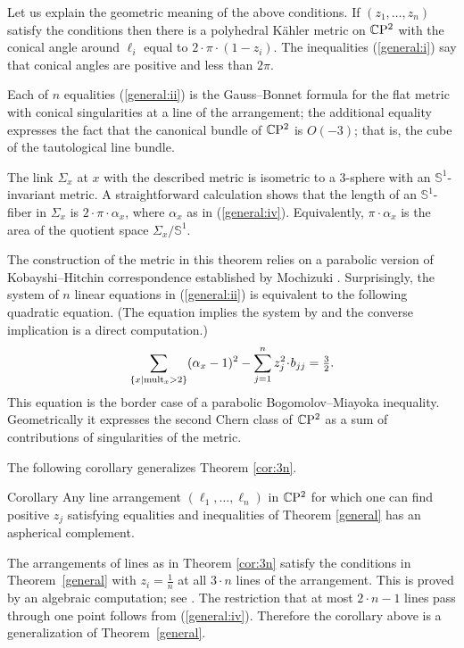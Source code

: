 \documentclass[oneside,a4paper]{article}
\begin{document}
Let us explain the geometric meaning of the above conditions.
If $(z_1,\dots,z_n)$ satisfy the conditions then
there is a polyhedral K\"ahler metric on $\mathbb{C}\mathrm{P}^2$
with the conical angle around $\ell_i$ equal to $2\cdot\pi\cdot(1-z_i)$.
The inequalities (\ref{general:i}) say that conical angles are positive and less than $2\pi$.

Each of $n$ equalities (\ref{general:ii}) 
is the Gauss--Bonnet formula
for the flat metric with conical singularities at a line of the arrangement;
the additional equality expresses the fact that the canonical bundle of
$\mathbb{C}\mathrm{P}^2$ is $O(-3)$;
that is, the cube of the tautological line bundle.

The link $\Sigma_x$ at $x$ with the described metric
is isometric to a $3$-sphere with an $\mathbb{S}^1$-invariant metric.
A straightforward calculation shows that
the length of an $\mathbb{S}^1$-fiber in $\Sigma_x$ is $2\cdot\pi\cdot\alpha_x$,
where $\alpha_x$ as in (\ref{general:iv}).
Equivalently, $\pi\cdot\alpha_x$ is the area of the quotient space $\Sigma_x/\mathbb{S}^1$.

The construction of the metric in this theorem relies on a parabolic version of Kobayshi--Hitchin correspondence
established by Mochizuki \cite{mochizuki}. 
Surprisingly, the system of $n$ linear equations in
(\ref{general:ii}) is equivalent to the following quadratic equation. 
(The equation 
implies the system by  \cite[Lemma 7.9]{panov} and  the converse implication 
is a direct computation.)
$$\sum_{\{x|\mult_x>2\}}(\alpha_x-1)^2
-
\sum_{j=1}^nz_j^2\cdot b_{jj}
=
\tfrac{3}{2}.$$
This equation is the border case of a parabolic Bogomolov--Miayoka inequality. Geometrically
it expresses the second Chern class of $\mathbb{C}\mathrm{P}^2$ as a sum of contributions of
singularities of the metric.

The following corollary generalizes Theorem \ref{cor:3n}.

\begin{thm}{Corollary}\label{generalarrangement}
Any line arrangement $(\ell_1,\dots,\ell_n)$ in $\mathbb{C}\mathrm{P}^2$
for which one can find positive $z_j$ satisfying equalities and inequalities
of Theorem  \ref{general} has an aspherical complement.
\end{thm}

The arrangements of lines
as in Theorem \ref{cor:3n}
satisfy the conditions in Theorem~\ref{general}
with $z_i =\tfrac1n$
at all $3\cdot n$ lines of the arrangement. 
This is proved by an algebraic computation; 
see \cite[Corollary 7.8]{panov}.
The restriction that at most $2\cdot n-1$ lines pass through one point
follows from (\ref{general:iv}).
Therefore the corollary above is a generalization of  Theorem~\ref{general}.
\end{document}
